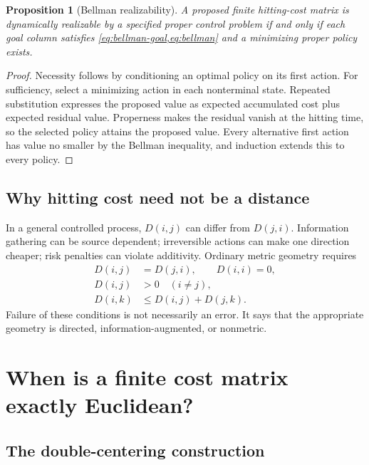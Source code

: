 \documentclass[11pt]{article}
\newtheorem{proposition}[theorem]{Proposition}
\theoremstyle{definition}
\theoremstyle{remark}
\begin{document}
\begin{proposition}[Bellman realizability]
\label{prop:bellman}
A proposed finite hitting-cost matrix is dynamically realizable by a specified
proper control problem if and only if each goal column satisfies
\cref{eq:bellman-goal,eq:bellman} and a minimizing proper policy exists.
\end{proposition}

\begin{proof}
Necessity follows by conditioning an optimal policy on its first action.
For sufficiency, select a minimizing action in each nonterminal state.
Repeated substitution expresses the proposed value as expected accumulated
cost plus expected residual value. Properness makes the residual vanish at
the hitting time, so the selected policy attains the proposed value. Every
alternative first action has value no smaller by the Bellman inequality, and
induction extends this to every policy.
\end{proof}

\subsection{Why hitting cost need not be a distance}

In a general controlled process, $D(i,j)$ can differ from $D(j,i)$.
Information gathering can be source dependent; irreversible actions can make
one direction cheaper; risk penalties can violate additivity. Ordinary metric
geometry requires
\begin{equation}
\begin{split}
 D(i,j)&=D(j,i),\qquad D(i,i)=0,\\
 D(i,j)&>0\quad(i\ne j),\\
 D(i,k)&\le D(i,j)+D(j,k).
\end{split}
\label{eq:metric-axioms}
\end{equation}
Failure of these conditions is not necessarily an error. It says that the
appropriate geometry is directed, information-augmented, or nonmetric.

\section{When is a finite cost matrix exactly Euclidean?}
\label{sec:distance}

\subsection{The double-centering construction}
\end{document}
